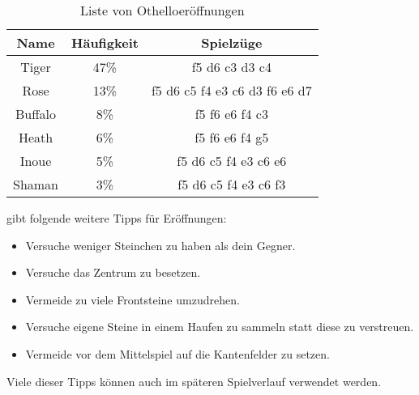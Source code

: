 \begin{table}[h]
  \centering
  \begin{tabular}{| c | c | c |}
    \hline
     Name & Häufigkeit & Spielzüge \\ \hline
     Tiger  &   47\%   & f5 d6 c3 d3 c4 \\ \hline
     Rose &   13\%   & f5 d6 c5 f4 e3 c6 d3 f6 e6 d7 \\ \hline
     Buffalo &  8\%    & f5 f6 e6 f4 c3 \\ \hline
     Heath  &  6\%    &  f5 f6 e6 f4 g5 \\ \hline
     Inoue &   5\%   &  f5 d6 c5 f4 e3 c6 e6\\ \hline
     Shaman &   3\%   & f5 d6 c5 f4 e3 c6 f3 \\ \hline
  \end{tabular}
  \caption{Liste von Othelloeröffnungen \cite{Ortiz.}}
  \label{tab:eroeffnungen}
\end{table}
\cite{Ortiz.} gibt folgende weitere Tipps für Eröffnungen:
\begin{itemize}
\item Versuche weniger Steinchen zu haben als dein Gegner.
\item Versuche das Zentrum zu besetzen.
\item Vermeide zu viele Frontsteine umzudrehen.
\item Versuche eigene Steine in einem Haufen zu sammeln statt diese zu verstreuen.
\item Vermeide vor dem Mittelspiel auf die Kantenfelder zu setzen.
\end{itemize}
Viele dieser Tipps können auch im späteren Spielverlauf verwendet werden.
